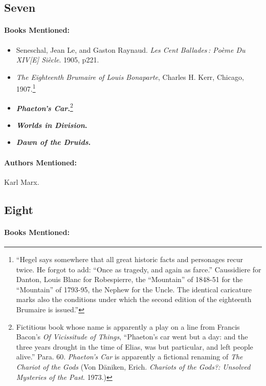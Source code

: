 \documentclass[12pt]{article}
\providecommand{\tightlist}{%
  \setlength{\itemsep}{0pt}\setlength{\parskip}{0pt}}
\begin{document}
\subsection{Seven}\label{seven-1}

\paragraph{Books Mentioned:}\label{books-mentioned-14}

\begin{itemize}
\tightlist
\item
  Seneschal, Jean Le, and Gaston Raynaud. \emph{Les Cent Ballades\,: Poème Du XIV{[}E{]} Siècle}. 1905, p221.
\item
  \emph{The Eighteenth Brumaire of Louis Bonaparte}, Charles H. Kerr, Chicago, 1907.\footnote{``Hegel says somewhere that all great historic facts and personages recur twice. He forgot to add: ``Once as tragedy, and again as farce.'' Caussidiere for Danton, Louis Blanc for Robespierre, the ``Mountain'' of 1848-51 for the ``Mountain'' of 1793-95, the Nephew for the Uncle. The identical caricature marks also the conditions under which the second edition of the eighteenth Brumaire is issued.''}
\item
  \textbf{\emph{Phaeton's Car}.}\footnote{Fictitious book whose name is apparently a play on a line from Francis Bacon's \emph{Of Vicissitude of Things}, ``Phaeton's car went but a day: and the three years drought in the time of Elias, was but particular, and left people alive.'' Para. 60. \emph{Phaeton's Car} is apparently a fictional renaming of \emph{The Chariot of the Gods} (Von Däniken, Erich. \emph{Chariots of the Gods?: Unsolved Mysteries of the Past}. 1973.)}
\item
  \textbf{\emph{Worlds in Division}.}
\item
  \textbf{\emph{Dawn of the Druids}.}
\end{itemize}

\paragraph{Authors Mentioned:}\label{authors-mentioned-10}

Karl Marx.

\subsection{Eight}\label{eight}

\paragraph{Books Mentioned:}\label{books-mentioned-15}
\end{document}
